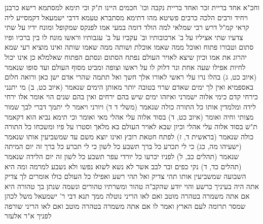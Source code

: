 \documentclass[12pt, openany]{book}
\begin{document}
{וחכ"א אחד בריית זכר ואחד בריית נקבה וכו' חכמים היינו ת"ק 
וכי תימא למסתמא רישא כרבנן ויחיד ורבים הלכה כרבים פשיטא 
מהו דתימא מסתברא טעמא דרבי ישמעאל דקמסייע ליה קראי קמ"ל
דרש רבי שמלאי למה הולד דומה במעי אמו לפנקס שמקופל ומונח ידיו על שתי צדעיו שתי אציליו על ב' ארכובותיו וב' עקביו על ב' עגבותיו וראשו מונח לו בין ברכיו ופיו סתום וטבורו פתוח ואוכל ממה שאמו אוכלת ושותה ממה שאמו שותה ואינו מוציא רעי שמא יהרוג את אמו וכיון שיצא לאויר העולם נפתח הסתום ונסתם הפתוח שאלמלא כן אינו יכול לחיות אפילו שעה אחת 
ונר דלוק לו על ראשו וצופה ומביט מסוף העולם ועד סופו שנאמר (איוב כט, ג) בהלו נרו עלי ראשי לאורו אלך חשך ואל תתמה שהרי אדם ישן כאן ורואה חלום באספמיא 
ואין לך ימים שאדם שרוי בטובה יותר מאותן הימים שנאמר (איוב כט, ב) מי יתנני כירחי קדם כימי אלוה ישמרני ואיזהו ימים שיש בהם ירחים ואין בהם שנים הוי אומר אלו ירחי לידה 
ומלמדין אותו כל התורה כולה שנאמר (משלי ד ד) ויורני ויאמר לי יתמך דברי לבך שמור מצותי וחיה ואומר (איוב כט, ד) בסוד אלוה עלי אהלי 
מאי ואומר וכי תימא נביא הוא דקאמר ת"ש בסוד אלוה עלי אהלי 
וכיון שבא לאויר העולם בא מלאך וסטרו על פיו ומשכחו כל התורה כולה שנאמר (בראשית ד, ז) לפתח חטאת רובץ 
ואינו יוצא משם עד שמשביעין אותו שנאמר (ישעיהו מה, כג) כי לי תכרע כל ברך תשבע כל לשון כי לי תכרע כל ברך זה יום המיתה שנאמר (תהלים כב, ל) לפניו יכרעו כל יורדי עפר תשבע כל לשון זה יום הלידה שנאמר (תהלים כד, ד) נקי כפים ובר לבב אשר לא נשא לשוא נפשו ולא נשבע למרמה
ומה היא השבועה שמשביעין אותו תהי צדיק ואל תהי רשע ואפילו כל העולם כולו אומרים לך צדיק אתה היה בעיניך כרשע והוי יודע שהקב"ה טהור ומשרתיו טהורים ונשמה שנתן בך טהורה היא אם אתה משמרה בטהרה מוטב ואם לאו הריני נוטלה ממך 
תנא דבי ר' ישמעאל משל לכהן שמסר תרומה לעם הארץ ואמר לו אם אתה משמרה בטהרה מוטב ואם לאו הריני שורפה לפניך 
א"ר אלעזר}
\end{document}
